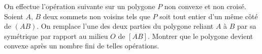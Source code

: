 On effectue l'opération suivante sur un polygone $P$ non convexe et non croisé. Soient $A$, $B$ deux sommets non voisins tels que $P$ soit tout entier d'un même côté de $(AB)$. On remplace l'une des deux parties du polygone reliant $A$ à $B$ par sa symétrique par rapport au milieu $O$ de $[AB]$. Montrer que le polygone devient convexe après un nombre fini de telles opérations.
